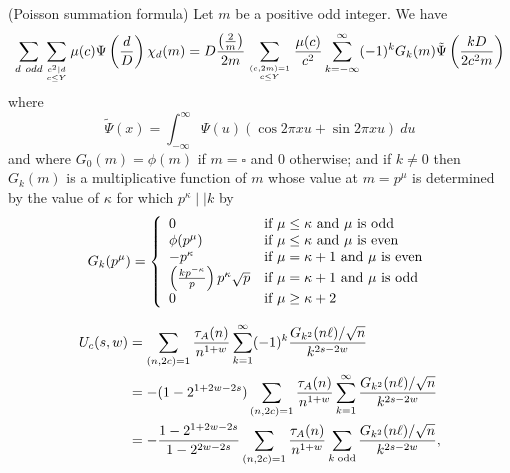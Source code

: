 \documentclass[10pt,a4paper]{amsart}
\begin{document}
	\begin{lemma}  \label{lemma:poisson} (Poisson summation formula)
		Let $m$ be a positive odd integer. We have 
		\begin{eqnarray*}
			\sum_{d ~ \textrm{odd} } \sum_{c^2\mid d\atop c\le Y} \mu(c)
			\Psi\left(\frac d D\right )\chi_d(m)
			=D\frac{\left(\frac 2 m \right)}{2m}\sum_{(c,2m)=1\atop c\le Y} \frac{\mu(c)}{c^2} \sum_{k = -\infty}^\infty (-1)^k   G_k(m) \tilde{\Psi}\left(\frac{kD}{2c^2m}\right)
		\end{eqnarray*} 
		where
		$$\tilde {\Psi}(x)=\int_{-\infty}^\infty \Psi(u)(\cos 2\pi xu+\sin 2\pi xu)~du$$
		and where $G_0(m)=\phi(m) $ if $m=\square$ and 0 otherwise; and  if $k\ne 0$ then  $G_k(m)$  is a multiplicative function of $m$ whose value at 
		$m=p^\mu$ is determined by the value of $\kappa$ for which
		$p^\kappa\mid\mid k$ by 
		\begin{eqnarray*}
			G_k(p^\mu)=\left\{
			\begin{array}{ll}
				0 & \mbox{if $ \mu \le \kappa$ and $\mu$ is odd} \\
				\phi(p^\mu) & \mbox{if $ \mu \le \kappa$ and $\mu$ is even} \\
				-p^\kappa & \mbox{if $ \mu = \kappa+1 $ and $\mu$ is even} \\
				\left(\frac{kp^{-\kappa}}{p}\right)p^\kappa\sqrt{p} & \mbox{if $ \mu = \kappa+1 $ and $\mu$ is odd} \\
				0 & \mbox{if $\mu\ge \kappa+2$}
			\end{array}
			\right.
		\end{eqnarray*}
	\end{lemma}

	\begin{align} 
		\label{eqn:euler2}
		\notag U_c(s,w) &= \sum_{(n,2c)=1} \frac{\tau_A(n)}{n^{1+w}}   
		\sum_{k=1}^\infty  (-1)^k \frac{G_{k^2}(n\ell) /\sqrt{n}}{k^{2s-2w}}\\
		\notag  &   = -(1-2^{1+2w-2s}) \sum_{(n,2c)=1} \frac{\tau_A(n)}{n^{1+w}} 
		\sum_{k=1}^\infty   \frac{G_{k^2}(n\ell) /\sqrt{n}}{k^{2s-2w}} \\
		&= - \frac{1-2^{1+2w-2s}}{1-2^{2w-2s}} \sum_{(n,2c)=1} \frac{\tau_A(n)}{n^{1+w}} 
		\sum_{k \; \mathrm{odd}}  \frac{G_{k^2}(n\ell) /\sqrt{n}}{k^{2s-2w}},
	\end{align}
\end{document}
